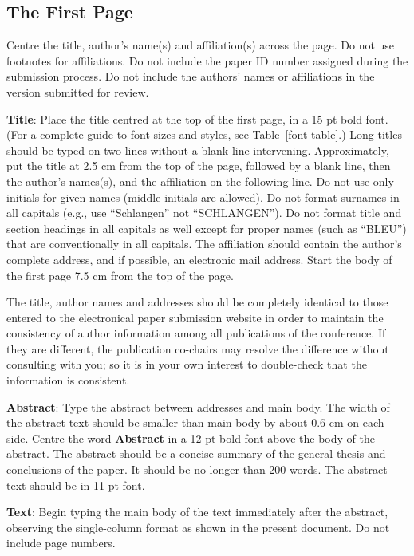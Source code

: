 \subsection{The First Page}
\label{ssec:first}

Centre the title, author's name(s) and affiliation(s) across
the page.
Do not use footnotes for affiliations. Do not include the
paper ID number assigned during the submission process. 
Do not include the authors' names or affiliations in the version submitted for review.

{\bf Title}: Place the title centred at the top of the first page, in
a 15 pt bold font. (For a complete guide to font sizes and styles,
see Table~\ref{font-table}.) Long titles should be typed on two lines
without a blank line intervening. Approximately, put the title at 2.5
cm from the top of the page, followed by a blank line, then the
author's names(s), and the affiliation on the following line. Do not
use only initials for given names (middle initials are allowed). Do
not format surnames in all capitals (e.g., use ``Schlangen'' not
``SCHLANGEN'').  Do not format title and section headings in all
capitals as well except for proper names (such as ``BLEU'') that are
conventionally in all capitals.  The affiliation should contain the
author's complete address, and if possible, an electronic mail
address. Start the body of the first page 7.5 cm from the top of the
page.

The title, author names and addresses should be completely identical
to those entered to the electronical paper submission website in order
to maintain the consistency of author information among all
publications of the conference. If they are different, the publication
co-chairs may resolve the difference without consulting with you; so it
is in your own interest to double-check that the information is
consistent.

{\bf Abstract}: Type the abstract between addresses and main body.
The width of the abstract text should be
smaller than main body by about 0.6 cm on each side.
Centre the word {\bf Abstract} in a 12 pt bold
font above the body of the abstract. The abstract should be a concise
summary of the general thesis and conclusions of the paper. It should
be no longer than 200 words. The abstract text should be in 11 pt font.

{\bf Text}: Begin typing the main body of the text immediately after
the abstract, observing the single-column format as shown in 
the present document. Do not include page numbers.

